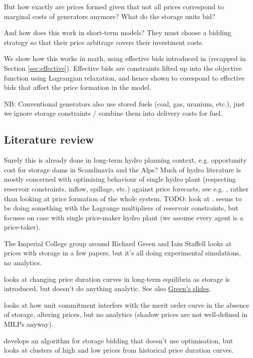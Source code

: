 \documentclass[final,3p]{elsarticle}
\begin{document}
But how exactly are prices formed given that not all prices correspond to
marginal costs of generators anymore? What do the storage units bid?

And how does this work in short-term models? They must choose a bidding strategy
so that their price arbitrage covers their investment costs.

We show how this works in math, using effective bids introduced in
\cite{Brown2020} (recapped in Section \ref{sec:effective}). Effective bids are
constraints lifted up into the objective function using Lagrangian relaxation,
and hence shown to corespond to effective bids that affect the price formation
in the model.

NB: Conventional generators also use stored fuels (coal, gas, uranium, etc.),
just we ignore storage constraints / combine them into delivery costs for fuel.

\subsection{Literature review}

Surely this is already done in long-term hydro planning context, e.g.
opportunity cost for storage dams in Scandinavia and the Alps? Much of hydro
literature is mostly concerned with optimising behaviour of single hydro plant
(respecting reservoir constraints, inflow, spillage, etc.) against price
forecasts, see e.g. \cite{Pereira1989,Rotting1992,Fosso1999}, rather than
looking at price formation of the whole system. TODO: look at
\cite{horsley2016}. \cite{Steeger2017} seems to be doing something with the
Lagrange multipliers of reservoir constraints, but focuses on case with single
price-maker hydro plant (we assume every agent is a price-taker).

The Imperial College group around Richard Green and Iain Staffell looks at
prices with storage in a few papers, but it's all doing experimental
simulations, no analytics.

\cite{Green2015} looks at changing price duration curves in long-term equilibria
as storage is introduced, but doesn't do anything analytic. See also
\href{https://spiral.imperial.ac.uk/handle/10044/1/51138}{Green's slides}.


\cite{Staffell2016} looks at how unit commitment interfers with the merit order
curve in the absence of storage, altering prices, but no analytics (shadow
prices are not well-defined in MILPs anyway).

\cite{Ward2018} develops an algorithm for storage bidding that doesn't use
optimisation, but looks at clusters of high and low prices from historical price
duration curves.
\end{document}
